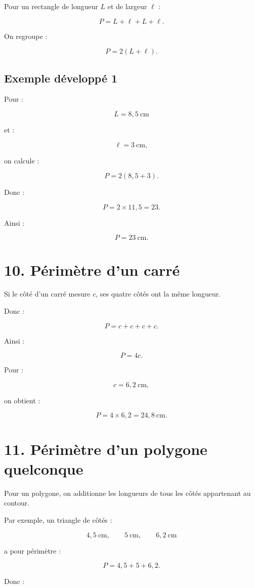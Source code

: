 Pour un rectangle de longueur $L$ et de largeur $\ell$ :

\[
P=L+\ell+L+\ell.
\]

On regroupe :

\[
\boxed{P=2(L+\ell)}.
\]

\subsection{Exemple développé 1}

Pour :

\[
L=8{,}5\ \text{cm}
\]

et :

\[
\ell=3\ \text{cm},
\]

on calcule :

\[
P=2(8{,}5+3).
\]

Donc :

\[
P=2\times11{,}5=23.
\]

Ainsi :

\[
\boxed{P=23\ \text{cm}}.
\]

\section{10. Périmètre d’un carré}

Si le côté d’un carré mesure $c$, ses quatre côtés ont la même longueur.

Donc :

\[
P=c+c+c+c.
\]

Ainsi :

\[
\boxed{P=4c}.
\]

Pour :

\[
c=6{,}2\ \text{cm},
\]

on obtient :

\[
P=4\times6{,}2=24{,}8\ \text{cm}.
\]

\section{11. Périmètre d’un polygone quelconque}

Pour un polygone, on additionne les longueurs de tous les côtés appartenant au contour.

Par exemple, un triangle de côtés :

\[
4{,}5\ \text{cm},\qquad5\ \text{cm},\qquad6{,}2\ \text{cm}
\]

a pour périmètre :

\[
P=4{,}5+5+6{,}2.
\]

Donc :

